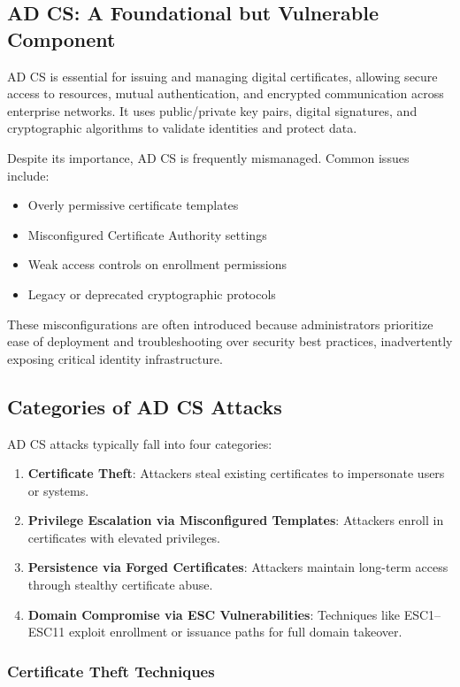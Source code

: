 \subsection{AD CS: A Foundational but Vulnerable Component}

AD CS is essential for issuing and managing digital certificates, allowing secure access to resources, mutual authentication, and encrypted communication across enterprise networks. It uses public/private key pairs, digital signatures, and cryptographic algorithms to validate identities and protect data.

Despite its importance, AD CS is frequently mismanaged. Common issues include:
\begin{itemize}
    \item Overly permissive certificate templates
    \item Misconfigured Certificate Authority settings
    \item Weak access controls on enrollment permissions
    \item Legacy or deprecated cryptographic protocols
\end{itemize}

These misconfigurations are often introduced because administrators prioritize ease of deployment and troubleshooting over security best practices, inadvertently exposing critical identity infrastructure.

\subsection{Categories of AD CS Attacks}

AD CS attacks typically fall into four categories:
\begin{enumerate}
    \item \textbf{Certificate Theft}: Attackers steal existing certificates to impersonate users or systems.
    \item \textbf{Privilege Escalation via Misconfigured Templates}: Attackers enroll in certificates with elevated privileges.
    \item \textbf{Persistence via Forged Certificates}: Attackers maintain long-term access through stealthy certificate abuse.
    \item \textbf{Domain Compromise via ESC Vulnerabilities}: Techniques like ESC1--ESC11 exploit enrollment or issuance paths for full domain takeover.
\end{enumerate}

\subsubsection{Certificate Theft Techniques}

